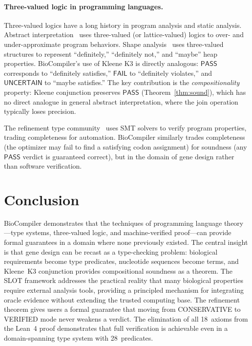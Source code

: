 \documentclass[acmsmall,review,anonymous]{acmart}
\newcommand{\PASS}{\ensuremath{\mathsf{PASS}}\xspace}
\newcommand{\FAIL}{\ensuremath{\mathsf{FAIL}}\xspace}
\newcommand{\UNCERTAIN}{\ensuremath{\mathsf{UNCERTAIN}}\xspace}
\begin{document}
\paragraph{Three-valued logic in programming languages.}
Three-valued logics have a long history in program analysis and static
analysis.  Abstract interpretation~\cite{cousot1977abstract} uses
three-valued (or lattice-valued) logics to over- and under-approximate
program behaviors.  Shape analysis~\cite{sagiv2002shape} uses
three-valued structures to represent ``definitely,'' ``definitely not,''
and ``maybe'' heap properties.  BioCompiler's use of Kleene K3 is
directly analogous: \PASS{} corresponds to ``definitely satisfies,''
\FAIL{} to ``definitely violates,'' and \UNCERTAIN{} to ``maybe
satisfies.''  The key contribution is the \emph{compositionality}
property: Kleene conjunction preserves \PASS{} (Theorem~\ref{thm:sound}),
which has no direct analogue in general abstract interpretation, where
the join operation typically loses precision.

The refinement type community~\cite{rondon2008liquid} uses SMT solvers
to verify program properties, trading completeness for automation.
BioCompiler similarly trades completeness (the optimizer may fail to find
a satisfying codon assignment) for soundness (any \PASS{} verdict is
guaranteed correct), but in the domain of gene design rather than
software verification.



\section{Conclusion}\label{sec:conclusion}

BioCompiler demonstrates that the techniques of programming language
theory---type systems, three-valued logic, and machine-verified
proof---can provide formal guarantees in a domain where none previously
existed.
The central insight is that gene design can be recast as a
type-checking problem: biological requirements become type predicates,
nucleotide sequences become terms, and Kleene~K3 conjunction provides
compositional soundness as a theorem.
The SLOT framework addresses the practical reality that many biological
properties require external analysis tools, providing a principled
mechanism for integrating oracle evidence without extending the trusted
computing base.
The refinement theorem gives users a formal guarantee that moving from
CONSERVATIVE to VERIFIED mode never weakens a verdict.
The elimination of all 18~axioms from the Lean~4 proof demonstrates
that full verification is achievable even in a domain-spanning type
system with 28~predicates.
\end{document}
